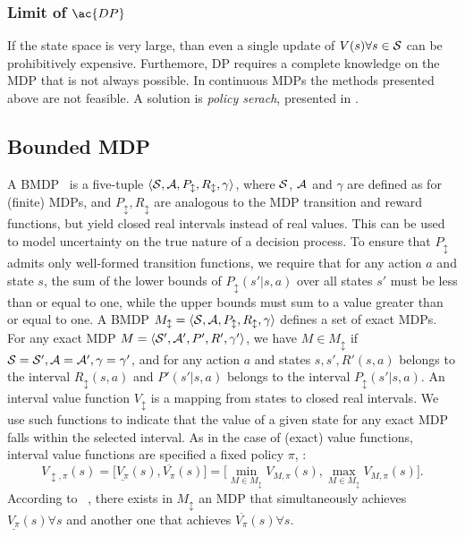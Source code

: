 \subsubsection{Limit of $\ac{DP}$}
If the state space is very large,  than even a single update of $V(s) \forall s \in \mathcal{S}$ can be prohibitively expensive. Furthemore, \ac{DP} requires a complete knowledge on the \ac{MDP} that is not always possible. In continuous \ac{MDP}s the methods presented above are not feasible. A solution is \emph{policy serach}, presented in .

\subsection{Bounded MDP}
A \acf{BMDP}~\citep[]{givan2000bounded} is a five-tuple $\langle \mathcal{S}, \mathcal{A}, P_{\updownarrow}, R_{\updownarrow}, \gamma \rangle$, where $\mathcal{S}$, $\mathcal{A}$ and $\gamma$ are defined as for (finite) MDPs, and $P_{\updownarrow}, R_{\updownarrow}$ are analogous to the MDP transition and reward functions, but yield closed real intervals instead of real values. This can be used to model uncertainty on the true nature of a decision process. To ensure that $P_{\updownarrow}$ admits only well-formed transition functions, we require that for any action $a$ and state $s$, the sum of the lower bounds of $P_{\updownarrow}(s'|s,a)$ over all states $s'$ must be less than or equal to one, while the upper bounds must sum to a value greater than or equal to one. A BMDP $M_{\updownarrow} = \langle \mathcal{S}, \mathcal{A}, P_{\updownarrow}, R_{\updownarrow}, \gamma \rangle$ defines a set of exact MDPs. For any exact MDP $M = \langle \mathcal{S}', \mathcal{A}', P', R', \gamma' \rangle$, we have $M \in M_{\updownarrow}$ if $\mathcal{S} = \mathcal{S}', \mathcal{A} = \mathcal{A}', \gamma = \gamma'$, and for any action $a$ and states $s, s', R'(s,a)$ belongs to the interval $R_{\updownarrow}(s,a)$ and $P'(s'|s,a)$ belongs to the interval $P_{\updownarrow}(s'|s,a)$. An interval value function $V_{\updownarrow}$ is a mapping from states to closed real intervals. We use such functions to indicate that the value of a given state for any exact MDP falls within the selected interval. As in the case of (exact) value functions, interval value functions are specified \wrt a fixed policy $\pi$, \ie:
$$V_{\updownarrow, \pi}(s) = \Big[ \underline{V_{\pi}}(s), \overline{V_{\pi}}(s)\Big] = \Big[ \min_{M \in M_{\updownarrow}} V_{M,\pi}(s), \max_{M \in M_{\updownarrow}} V_{M,\pi}(s)\Big].$$
According to ~\citep{givan2000bounded}, there exists in $M_{\updownarrow}$ an \ac{MDP} that simultaneously achieves $\underline{V_{\pi}}(s) \forall s$ and another one that achieves $\overline{V_{\pi}}(s) \forall s$.\\
